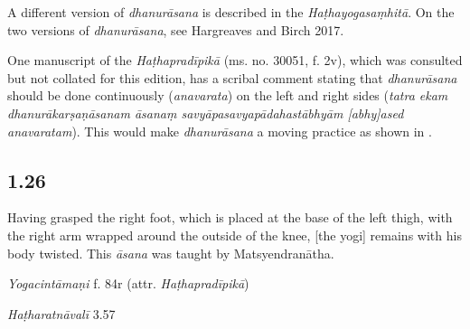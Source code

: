 \begin{ekdosis}
\begin{philcomm}[hp01_025]
A different version of \emph{dhanurāsana} is described in the \emph{Haṭhayogasaṃhitā}. On the two versions of \emph{dhanurāsana}, see Hargreaves and Birch 2017.

One manuscript of the \emph{Haṭhapradīpikā} (ms. no. 30051, f. 2v), which was consulted but not collated for this edition, has a scribal comment stating that \emph{dhanurāsana} should be done continuously (\emph{anavarata}) on the left and right sides (\emph{tatra ekam dhanurākarṣaṇāsanam āsanaṃ savyāpasavyapādahastābhyām [abhy]ased anavaratam}). This would make \emph{dhanurāsana} a moving practice as shown in . 
\end{philcomm}

\subsection*{1.26}
\begin{translation}[hp01_026]
Having grasped the right foot, which is placed at the base of the left thigh, with the right arm wrapped around the outside of the knee, [the yogi] remains with his body twisted. This \emph{āsana} was taught by Matsyendranātha.%
\end{translation}

\begin{testimonia}[hp01_026]
\emph{Yogacintāmaṇi} f. 84r (attr. \emph{Haṭhapradīpikā})

\begin{versinnote}
\end{versinnote}

\emph{Haṭharatnāvalī} 3.57

\begin{versinnote}
\tl{\var{°dakṣapādo ] °dakṣapādaṃ P, °dakṣapādau t1}\\!}
\end{versinnote}


\end{testimonia}
\end{ekdosis}
